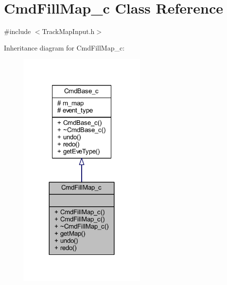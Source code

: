 \hypertarget{class_cmd_fill_map__c}{\section{Cmd\+Fill\+Map\+\_\+c Class Reference}
\label{class_cmd_fill_map__c}
}


{\ttfamily \#include $<$Track\+Map\+Input.\+h$>$}



Inheritance diagram for Cmd\+Fill\+Map\+\_\+c\+:
\nopagebreak
\begin{figure}[H]
\begin{center}
\leavevmode
\includegraphics[width=180pt]{class_cmd_fill_map__c__inherit__graph}
\end{center}
\end{figure}


